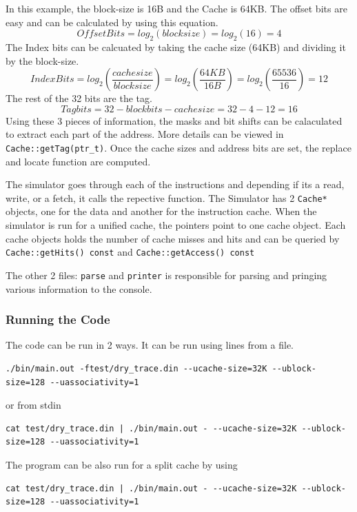 \documentclass{article}
\begin{document}
			In this example, the block-size is 16B and the Cache is 64KB. The offset bits are easy and can be calculated by using this equation.
			\[ Offset Bits = log_2(blocksize) = log_2(16) = 4  \]
			The Index bits can be calcuated by taking the cache size (64KB) and dividing it by the block-size.
			\[ Index Bits = log_2\left(\frac{cachesize}{blocksize}\right) = log_2\left(\frac{64KB}{16B}\right) = log_2\left(\frac{65536}{16}\right) = 12 \]
			The rest of the 32 bits are the tag.
			\[ Tag bits = 32 - blockbits - cachesize = 32 - 4 - 12 = 16 \]
			Using these 3 pieces of information, the masks and bit shifts can be calaculated to extract each part of the address. More details can be viewed in \verb|Cache::getTag(ptr_t)|. Once the cache sizes and address bits are set, the replace and locate function are computed.
			\par
			The simulator goes through each of the instructions and depending if its a read, write, or a fetch, it calls the repective function. The Simulator has 2 \verb|Cache*| objects, one for the data and another for the instruction cache. When the simulator is run for a unified cache, the pointers point to one cache object. Each cache objects holds the number of cache misses and hits and can be queried by \verb|Cache::getHits() const| and \verb|Cache::getAccess() const|
			\par
			The other 2 files: \verb|parse| and \verb|printer| is responsible for parsing and pringing various information to the console.
		\subsubsection{Running the Code}
			The code can be run in 2 ways. It can be run using lines from a file.
			\begin{lstlisting}
./bin/main.out -ftest/dry_trace.din --ucache-size=32K --ublock-size=128 --uassociativity=1
			\end{lstlisting}
			or from stdin
			\begin{lstlisting}
cat test/dry_trace.din | ./bin/main.out - --ucache-size=32K --ublock-size=128 --uassociativity=1
			\end{lstlisting}
			The program can be also run for a split cache by using
			\begin{lstlisting}
cat test/dry_trace.din | ./bin/main.out - --ucache-size=32K --ublock-size=128 --uassociativity=1
			\end{lstlisting}
\end{document}
